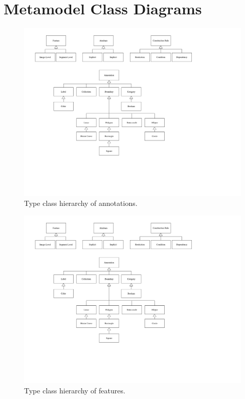 \chapter{Metamodel Class Diagrams}
\label{ch:metamodel_class_diagrams}

\begin{figure}[p]
  \centering
  \includegraphics{images/class_diagrams/annotation}
  \caption{Type class hierarchy of annotations.}
  \label{fig:metamodel_class_diagrams:annotation}  
\end{figure}

\clearpage

\begin{figure}[p]
  \centering
  \includegraphics{images/class_diagrams/feature}
  \caption{Type class hierarchy of features.}
  \label{fig:metamodel_class_diagrams:feature}   
\end{figure}

